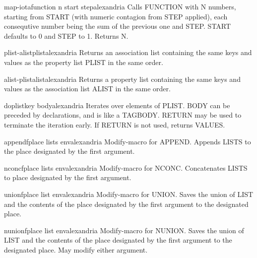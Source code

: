 \begin{function}{map-iota}{function n \key start step}{alexandria}{}
  Calls FUNCTION with N numbers, starting from START (with numeric contagion
from STEP applied), each consequtive number being the sum of the previous one
and STEP. START defaults to 0 and STEP to 1. Returns N.
\end{function}

\begin{function}{plist-alist}{plist}{alexandria}{}
  Returns an association list containing the same keys and values as the
property list PLIST in the same order.
\end{function}

\begin{function}{alist-plist}{alist}{alexandria}{}
  Returns a property list containing the same keys and values as the
association list ALIST in the same order.
\end{function}

\begin{macro}{doplist}{key \body body}{alexandria}{}
  Iterates over elements of PLIST. BODY can be preceded by
declarations, and is like a TAGBODY. RETURN may be used to terminate
the iteration early. If RETURN is not used, returns VALUES.
\end{macro}

\begin{macro}{appendf}{place \rest lists \env env}{alexandria}{}
  Modify-macro for APPEND. Appends LISTS to the place designated by the first
argument.
\end{macro}

\begin{macro}{nconcf}{place \rest lists \env env}{alexandria}{}
  Modify-macro for NCONC. Concatenates LISTS to place designated by the first
argument.
\end{macro}

\begin{macro}{unionf}{place list \env env}{alexandria}{}
  Modify-macro for UNION. Saves the union of LIST and the contents of the
place designated by the first argument to the designated place.
\end{macro}

\begin{macro}{nunionf}{place list \env env}{alexandria}{}
  Modify-macro for NUNION. Saves the union of LIST and the contents of the
place designated by the first argument to the designated place. May modify
either argument.
\end{macro}

